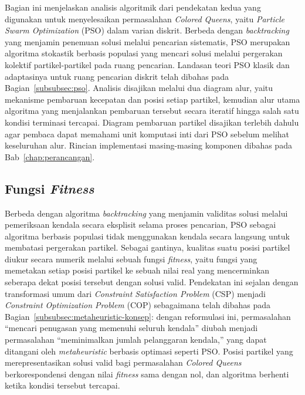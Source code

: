Bagian ini menjelaskan analisis algoritmik dari pendekatan kedua yang digunakan untuk menyelesaikan permasalahan \textit{Colored Queens}, yaitu \textit{Particle Swarm Optimization} (PSO) dalam varian diskrit. Berbeda dengan \textit{backtracking} yang menjamin penemuan solusi melalui pencarian sistematis, PSO merupakan algoritma stokastik berbasis populasi yang mencari solusi melalui pergerakan kolektif partikel-partikel pada ruang pencarian. Landasan teori PSO klasik dan adaptasinya untuk ruang pencarian diskrit telah dibahas pada Bagian~\ref{subsubsec:pso}. Analisis disajikan melalui dua diagram alur, yaitu mekanisme pembaruan kecepatan dan posisi setiap partikel, kemudian alur utama algoritma yang menjalankan pembaruan tersebut secara iteratif hingga salah satu kondisi terminasi tercapai. Diagram pembaruan partikel disajikan terlebih dahulu agar pembaca dapat memahami unit komputasi inti dari PSO sebelum melihat keseluruhan alur. Rincian implementasi masing-masing komponen dibahas pada Bab~\ref{chap:perancangan}.

\subsection{Fungsi \textit{Fitness}}
\label{subsec:fungsi-fitness-pso}

Berbeda dengan algoritma \textit{backtracking} yang menjamin validitas solusi melalui pemeriksaan kendala secara eksplisit selama proses pencarian, PSO sebagai algoritma berbasis populasi tidak menggunakan kendala secara langsung untuk membatasi pergerakan partikel. Sebagai gantinya, kualitas suatu posisi partikel diukur secara numerik melalui sebuah fungsi \textit{fitness}, yaitu fungsi yang memetakan setiap posisi partikel ke sebuah nilai real yang mencerminkan seberapa dekat posisi tersebut dengan solusi valid. Pendekatan ini sejalan dengan transformasi umum dari \textit{Constraint Satisfaction Problem} (CSP) menjadi \textit{Constraint Optimization Problem} (COP) sebagaimana telah dibahas pada Bagian~\ref{subsubsec:metaheuristic-konsep}: dengan reformulasi ini, permasalahan ``mencari penugasan yang memenuhi seluruh kendala'' diubah menjadi permasalahan ``meminimalkan jumlah pelanggaran kendala,'' yang dapat ditangani oleh \textit{metaheuristic} berbasis optimasi seperti PSO. Posisi partikel yang merepresentasikan solusi valid bagi permasalahan \textit{Colored Queens} berkorespondensi dengan nilai \textit{fitness} sama dengan nol, dan algoritma berhenti ketika kondisi tersebut tercapai.


